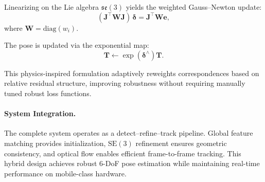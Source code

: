 Linearizing on the Lie algebra $\mathfrak{se}(3)$ yields the weighted Gauss--Newton update:
\begin{equation}
(\mathbf{J}^\top \mathbf{W} \mathbf{J})\,\boldsymbol{\delta}
=
\mathbf{J}^\top \mathbf{W} \mathbf{e},
\end{equation}
where $\mathbf{W} = \mathrm{diag}(w_i)$.

The pose is updated via the exponential map:
\begin{equation}
\mathbf{T} \leftarrow \exp(\boldsymbol{\delta}^\wedge)\mathbf{T}.
\end{equation}

This physics-inspired formulation adaptively reweights correspondences based on relative residual structure, improving robustness without requiring manually tuned robust loss functions.

\paragraph{System Integration.}
The complete system operates as a detect--refine--track pipeline. Global feature matching provides initialization, $\mathrm{SE}(3)$ refinement ensures geometric consistency, and optical flow enables efficient frame-to-frame tracking. This hybrid design achieves robust 6-DoF pose estimation while maintaining real-time performance on mobile-class hardware.